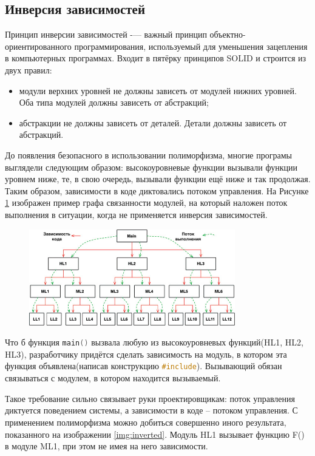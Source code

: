 \subsection{Инверсия зависимостей}

Принцип инверсии зависимостей -— важный принцип объектно-ориентированного программирования, используемый для уменьшения зацепления в компьютерных программах. Входит в пятёрку принципов SOLID и строится из двух правил:
\begin{itemize}
	\item модули верхних уровней не должны зависеть от модулей нижних уровней. Оба типа модулей должны зависеть от абстракций;
	\item абстракции не должны зависеть от деталей. Детали должны зависеть от абстракций.
\end{itemize}

До появления безопасного в использовании полиморфизма, многие програмы выглядели следующим образом: высокоуровневые функции вызывали функции уровнем ниже, те, в свою очередь, вызывали функции ещё ниже и так продолжая. Таким образом, зависимости в коде диктовались потоком управления. На Рисунке \ref{img:direct:dep} изображен пример графа связанности модулей, на который наложен поток выполнения в ситуации, когда не применяется инверсия зависимостей.

\begin{figure}[h]
  \centering
    \includegraphics[width=0.8\textwidth]{inc/img/direct.jpeg}
  \label{img:direct:dep}
\end{figure}

Что б функция \lstinline[language=C]{main()} вызвала любую из высокоуровневых функций(HL1, HL2, HL3), разработчику придётся сделать зависимость на модуль, в котором эта функция объявлена(написав конструкцию \lstinline[language=C]{#include}). Вызывающий обязан связываться с модулем, в котором находится вызываемый.

Такое требование сильно связывает руки проектировщикам: поток управления диктуется поведением системы, а зависимости в коде -- потоком управления. С применением полиморфизма можно добиться совершенно иного результата, показанного на изображении \ref{img:inverted}. Модуль HL1 вызывает функцию F() в модуле ML1, при этом не имея на него зависимости.

